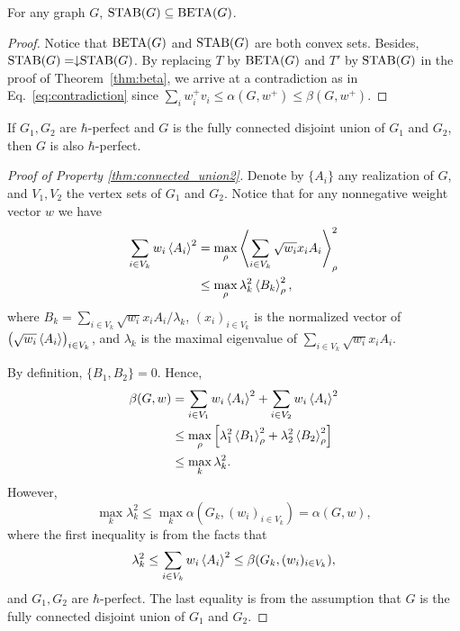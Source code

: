 \begin{theorem}
	For any graph $G$, $\operatorname{STAB}(G) \subseteq \operatorname{BETA}(G)$.
\end{theorem}
\begin{proof}
    Notice that $\operatorname{BETA}(G)$ and $\operatorname{STAB}(G)$ are both convex sets. Besides, $\operatorname{STAB}(G) = \downarrow\hspace{-0.3em} \operatorname{STAB}(G)$. By replacing $T$ by $\operatorname{BETA}(G)$ and $T'$ by $\operatorname{STAB}(G)$ in the proof of Theorem~\ref{thm:beta}, we arrive at a contradiction as in Eq.~\eqref{eq:contradiction} since $\sum_i w_i^+ v_i \le \alpha(G,w^+) \le \beta(G,w^+)$.
\end{proof}

\setcounter{prop}{0}
\begin{prop}
\label{thm:connected_union2}
If $G_1, G_2$ are $\hbar$-perfect and $G$ is the fully connected disjoint union of $G_1$ and $G_2$, then $G$ is also $\hbar$-perfect.
\end{prop}

\begin{proof}[Proof of Property \ref{thm:connected_union2}] 
Denote by $\{A_{i}\}$ any realization of $G$, and $V_1, V_2$ the vertex sets of $G_1$ and $G_2$. 
Notice that for any nonnegative weight vector $w$ we have
\begin{align}
      \sum_{i\in V_k} w_i \left\langle A_i \right\rangle^2 &= \max_{\rho}\left\langle \sum_{i\in V_k} \sqrt{w_{i}}  x_{i} A_{i} \right\rangle_{\rho}^2 \nonumber\\
      &\le \max_{\rho} \lambda_k^2 \left\langle B_k \right\rangle_{\rho}^2,
\end{align}
where $B_k = \sum_{i\in V_k} \sqrt{w_{i}}  x_{i} A_{i}/ \lambda_k$, $(x_i)_{i\in V_k}$ is the normalized vector of $\left(\sqrt{w_{i}} \left\langle A_{i} \right\rangle\right)_{i\in V_k}$, and $\lambda_k$ is the maximal eigenvalue of $\sum_{i\in V_k} \sqrt{w_{i}}x_{i}A_{i}$.

By definition, $\{B_1, B_2\} = 0$. Hence,
\begin{align}
      \beta(G,w) &= \sum_{i\in V_1} w_i \left\langle A_i \right\rangle^2 + \sum_{i\in V_2} w_i \left\langle A_i \right\rangle^2 \nonumber\\
      &\le \max_{\rho} \left[\lambda_1^2 \left\langle B_1 \right\rangle_{\rho}^2 + \lambda_2^2 \left\langle B_2 \right\rangle_{\rho}^2\right]\nonumber\\
      &\le \max_k \lambda_k^2.
\end{align}
However,
\begin{equation}
      \max_k \lambda_k^2 \le \max_k \alpha(G_k,(w_i)_{i\in V_k}) = \alpha(G,w),
\end{equation}
where the first inequality is from the facts that
\begin{equation}
    \lambda_k^2 \le \sum_{i\in V_k} w_i \left\langle A_i \right\rangle^2 \le \beta(G_k,(w_i)_{i\in V_k}),
\end{equation}
and $G_1, G_2$ are $\hbar$-perfect. The last equality is from the assumption that $G$ is the fully connected disjoint union of $G_1$ and $G_2$.
\end{proof}

